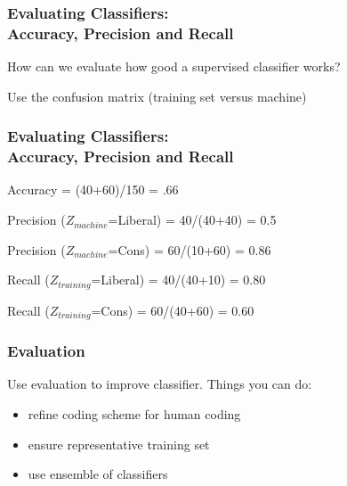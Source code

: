 \documentclass[11pt,compress,professionalfonts]{beamer}
\newcommand{\ita}{\begin{itemize}}
\newcommand{\itm}{\item[]}
\newcommand{\itz}{\end{itemize}}
\begin{document}
\begin{frame}[t,fragile]\frametitle{Evaluating Classifiers:\\Accuracy, Precision and Recall}

How can we evaluate how good a supervised classifier works?

Use the confusion matrix (training set versus machine)


\end{frame}
\begin{frame}[t,fragile]\frametitle{Evaluating Classifiers:\\Accuracy, Precision and Recall}

\begin{center}
\end{center}

\vspace*{0.5cm}

Accuracy = (40+60)/150 = .66

Precision ($Z_{machine}$=Liberal) = 40/(40+40) = 0.5

Precision ($Z_{machine}$=Cons) = 60/(10+60) = 0.86

Recall ($Z_{training}$=Liberal) = 40/(40+10) = 0.80

Recall ($Z_{training}$=Cons) = 60/(40+60) = 0.60


\end{frame}
\begin{frame}[t,fragile]\frametitle{Evaluation}

Use evaluation to improve classifier. Things you can do:

\ita
\itm refine coding scheme for human coding
\itm ensure representative training set
\itm use ensemble of classifiers

\itz

\end{frame}
\end{document}
